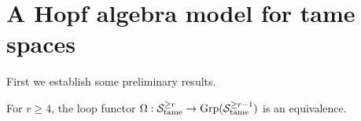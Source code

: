 %	
%
%	
%



\section{A Hopf algebra model for tame spaces}
\label{Hopf algebra model for tame spaces}

First we establish some preliminary results.
\begin{proposition}
\label{tame recognition theorem}
For $r\geq 4$,
	the loop functor $\Omega: {\mathcal{S}}^{\geq r}_{\operatorname{\operatorname{tame}}}\to \operatorname{Grp}({\mathcal{S}}^{\geq r-1}_{\operatorname{\operatorname{tame}}})$ is an equivalence. 
\end{proposition}

